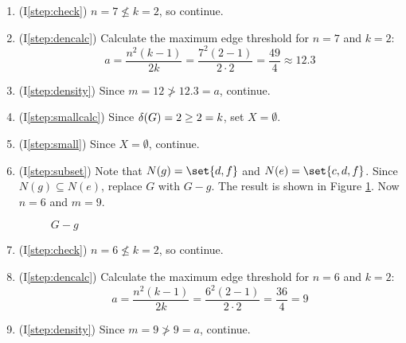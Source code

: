 \begin{enumerate}
\item (I\ref{step:check}) \(n=7\nleq k=2\), so continue.

\item (I\ref{step:dencalc}) Calculate the maximum edge threshold for \(n=7\) and \(k=2\):
  \[a=\frac{n^2(k-1)}{2k}=\frac{7^2(2-1)}{2\cdot2}=\frac{49}{4}\approx12.3\]

\item (I\ref{step:density}) Since \(m=12\ngtr12.3=a\), continue.

\item (I\ref{step:smallcalc}) Since \(\delta(G)=2\ge2=k\), set \(X=\emptyset\).

\item (I\ref{step:small}) Since \(X=\emptyset\), continue.

\item (I\ref{step:subset}) Note that \(N(g)=\set{d,f}\) and \(N(e)=\set{c,d,f}\).  Since \(N(g)\subseteq N(e)\),
  replace \(G\) with \(G-g\).  The result is shown in Figure \ref{fig:removeg}.  Now \(n=6\) and \(m=9\).

  \begin{figure}[h]
    \label{fig:removeg}
    \begin{center}
    \end{center}
    \caption{\(G-g\)}
  \end{figure}

\item (I\ref{step:check}) \(n=6\nleq k=2\), so continue.

\item (I\ref{step:dencalc}) Calculate the maximum edge threshold for \(n=6\) and \(k=2\):
  \[a=\frac{n^2(k-1)}{2k}=\frac{6^2(2-1)}{2\cdot2}=\frac{36}{4}=9\]

\item (I\ref{step:density}) Since \(m=9\ngtr9=a\), continue.


\end{enumerate}
